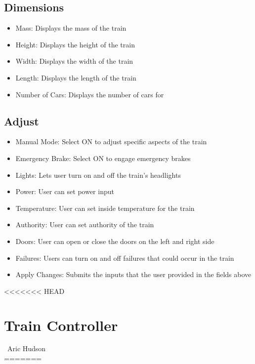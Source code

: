 \documentclass{scrreprt}
\begin{document}
\section{Dimensions}
\begin{itemize}
    \item Mass: Displays the mass of the train
    \item Height: Displays the height of the train
    \item Width: Displays the width of the train
    \item Length: Displays the length of the train
    \item Number of Cars: Displays the number of cars for
\end{itemize}

\section{Adjust}

\begin{itemize}
    \item Manual Mode: Select ON to adjust specific aspects of the train
    \item Emergency Brake: Select ON to engage emergency brakes
    \item Lights: Lets user turn on and off the train's headlights
    \item Power: User can set power input
    \item Temperature: User can set inside temperature for the train
    \item Authority: User can set authority of the train
    \item Doors: User can open or close the doors on the left and right side
    \item Failures: Users can turn on and off failures that could occur in the train
    \item Apply Changes: Submits the inputs that the user provided in the fields above
    \end{itemize}


<<<<<<< HEAD
\chapter{Train Controller}\
\Large{Aric Hudson}\\
=======
\end{document}
